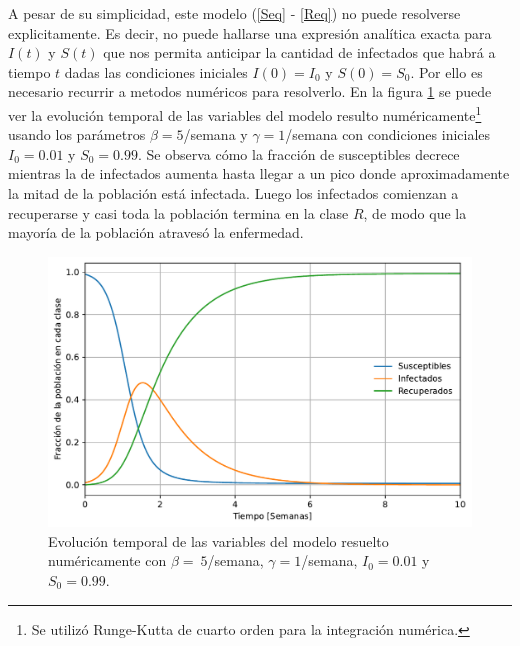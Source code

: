 A pesar de su simplicidad, este modelo (\ref{Seq} - \ref{Req}) no puede resolverse explicitamente. Es decir, no puede hallarse una expresión analítica exacta
para $I(t)$ y $S(t)$ que nos permita anticipar la cantidad de infectados que habrá a tiempo $t$ dadas las condiciones iniciales $I(0)=I_0$ y $S(0)=S_0$. Por ello
es necesario recurrir a metodos numéricos para resolverlo. En la figura \ref{fig:SIR} se puede ver la evolución temporal de las variables del modelo 
resulto numéricamente\footnote{Se utilizó Runge-Kutta de cuarto orden para la integración numérica.\cite{Recipes}} usando los parámetros $\beta=5$/semana y
$\gamma=1$/semana con condiciones iniciales $I_0=0.01$ y $S_0=0.99$. Se observa cómo la fracción de susceptibles decrece mientras la de infectados 
aumenta hasta llegar a un pico donde aproximadamente la mitad de la población está infectada. Luego los infectados comienzan a recuperarse y casi toda
la población termina en la clase $R$, de modo que la mayoría de la población atravesó la enfermedad.

\begin{figure}[h]
  \centering
  \includegraphics[width=\imsizeL]{SIR.pdf}
  \caption[Solución numérica del modelo S-I-R]{Evolución temporal de las variables del modelo resuelto numéricamente 
  con $\beta=~5$/semana, $\gamma=1$/semana, $I_0=0.01$ y $S_0=0.99$.}
  \label{fig:SIR}
\end{figure}


